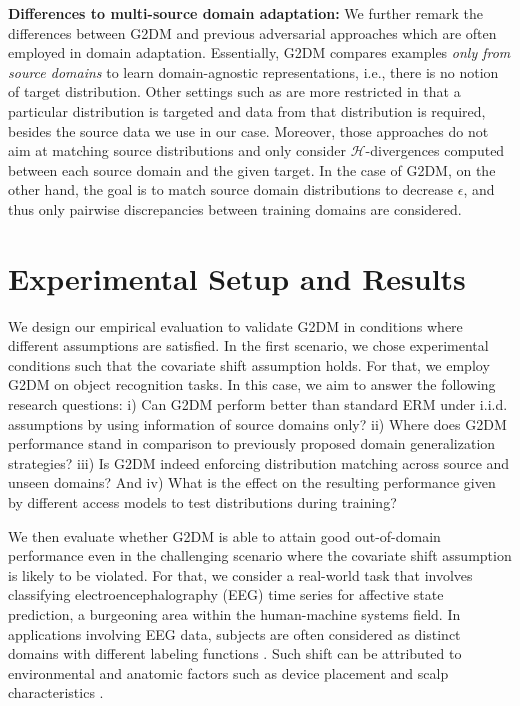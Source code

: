 \documentclass{article}
\begin{document}
\textbf{Differences to multi-source domain adaptation:} We further remark the differences between G2DM and previous adversarial approaches which are often employed in domain adaptation. Essentially, G2DM compares examples \emph{only from source domains} to learn domain-agnostic representations, i.e., there is no notion of target distribution. Other settings such as \cite{sun2015survey, peng2019moment} are more restricted in that a particular distribution is targeted and data from that distribution is required, besides the source data we use in our case. Moreover, those approaches do not aim at matching source distributions and only consider $\mathcal{H}$-divergences computed between each source domain and the given target. In the case of G2DM, on the other hand, the goal is to match source domain distributions to decrease $\epsilon$, and thus only pairwise discrepancies between training domains are considered.

\section{Experimental Setup and Results}\label{sec:res}


We design our empirical evaluation to validate G2DM in conditions where different assumptions are satisfied. In the first scenario, we chose experimental conditions such that the covariate shift assumption holds. For that, we employ G2DM on object recognition tasks. In this case, we aim to answer the following research questions: i) Can G2DM perform better than standard ERM under i.i.d. assumptions by using information of source domains only? ii) Where does G2DM performance stand in comparison to previously proposed domain generalization strategies? iii) Is G2DM indeed enforcing distribution matching across source and unseen domains? And iv) What is the effect on the resulting performance given by different access models to test distributions during training?

We then evaluate whether G2DM is able to attain good out-of-domain performance even in the challenging scenario where the covariate shift assumption is likely to be violated. For that, we consider a real-world task that involves classifying electroencephalography (EEG) time series for affective state prediction, a burgeoning area within the human-machine systems field. In applications involving EEG data, subjects are often considered as distinct domains with different labeling functions \cite{albuquerque2019cross}. Such shift can be attributed to environmental and anatomic factors such as device placement and scalp characteristics \cite{wu2015reducing, wei2018subject}. 
\end{document}
